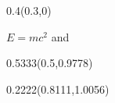 \documentclass{beamer}
\begin{document}
{\begin{frame}[plain,t]
\begin{textblock}{0.4}(0.3,0)
{\raggedright\fontsize{20}{24}\selectfont $E=mc^2$ and \par}
\end{textblock}

\begin{textblock}{0.5333}(0.5,0.9778)
\raggedleft{\insertslidenavigationsymbol\insertframenavigationsymbol\insertsubsectionnavigationsymbol\insertsectionnavigationsymbol\insertdocnavigationsymbol\insertbackfindforwardnavigationsymbol}
\end{textblock}

\begin{textblock}{0.2222}(0.8111,1.0056)
\raggedleft{\small\color{black!55}\insertframenumber\,/\,\inserttotalframenumber}
\end{textblock}
\end{frame}
}
\end{document}
